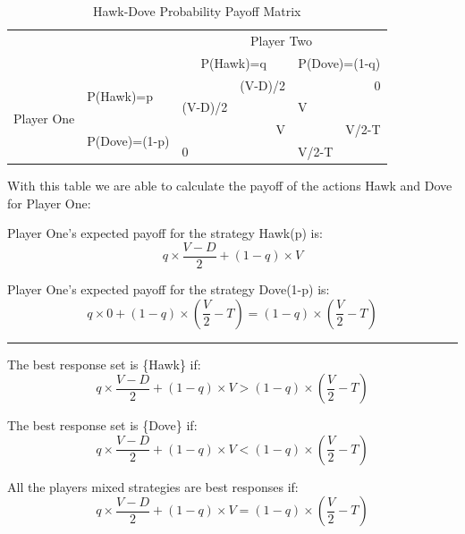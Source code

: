 \documentclass[a4paper, 11pt]{article}
\begin{document}
\begin{table}[H]
\centering
\caption{Hawk-Dove Probability Payoff Matrix}
\label{tab-HawkDoveMixedStrategy}
\begin{tabular}{cl|ll|ll|}
\multicolumn{1}{l}{}                             &                                & \multicolumn{4}{c|}{Player Two}                                             \\ \cline{3-6} 
\multicolumn{1}{l}{}                             &                                & \multicolumn{2}{c|}{P(Hawk)=q}         & \multicolumn{2}{c|}{P(Dove)=(1-q)} \\ \hline
\multicolumn{1}{c|}{\multirow{4}{*}{Player One}} & \multirow{2}{*}{P(Hawk)=p}     &         & \multicolumn{1}{r|}{(V-D)/2} &       & \multicolumn{1}{r|}{0}     \\
\multicolumn{1}{c|}{}                            &                                & (V-D)/2 &                              & V     &                            \\ \cline{2-6} 
\multicolumn{1}{c|}{}                            & \multirow{2}{*}{P(Dove)=(1-p)} &         & \multicolumn{1}{r|}{V}       &       & \multicolumn{1}{r|}{V/2-T} \\
\multicolumn{1}{c|}{}                            &                                & 0       &                              & V/2-T &                            \\ \hline
\end{tabular}
\end{table}

With this table we are able to calculate the payoff of the actions Hawk and Dove for Player One:

Player One's expected payoff for the strategy Hawk(p) is:
\[ q \times \frac{V-D}{2} + (1-q) \times V \]

Player One's expected payoff for the strategy Dove(1-p) is:
\[ q \times 0 + (1-q) \times ( \frac{V}{2} - T) = (1-q) \times ( \frac{V}{2} - T) \]

\hrule
\vspace{6pt}

The best response set is \{Hawk\} if:
\[ q \times \frac{V-D}{2} + (1-q) \times V > (1-q) \times ( \frac{V}{2} - T) \]

The best response set is \{Dove\} if:
\[ q \times \frac{V-D}{2} + (1-q) \times V < (1-q) \times ( \frac{V}{2} - T) \]

All the players mixed strategies are best responses if:
\[ q \times \frac{V-D}{2} + (1-q) \times V = (1-q) \times ( \frac{V}{2} - T) \]
\end{document}
